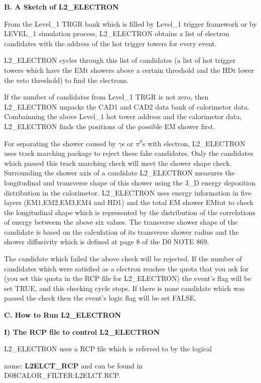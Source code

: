 \vskip 0.3in
\centerline{\bf B. A Sketch of L2\_ELECTRON}
\vskip 0.1in
From the Level\_1 TRGR bank which is filled by Level\_1 trigger 
framework
or by LEVEL\_1 simulation process, L2\_ELECTRON obtains a 
list of electron
candidates with the address of the hot trigger towers for every event.  

L2\_ELECTRON cycles through this list of candidates (a list
 of hot trigger
towers which have the EMt showers above a certain threshold
 and the HDt lower
the veto threshold) to find the electrons.

If the number of candidates from Level\_1 TRGR is not zero, then 
L2\_ELECTRON
unpacks the CAD1 and CAD2 data bank of calorimetor data.  Combainning 
the above 
Level\_1 hot tower address and the calorimetor data, L2\_ELECTRON 
finds the positions of the possible EM 
shower first.
 
For separating the shower caused by $\gamma$s or $\pi^0$s
with electron,
L2\_ELECTRON uses track marching package to reject these 
fake candidates. Only
the candidates which passed this track marching check will 
meet the shower shape
check. Surrounding the shower axis of a candidate 
L2\_ELECTRON measures the 
longitudinal and transverse shape of this shower 
using the 3\_D energy 
deposition distribution in the calorimetor. L2\_ELECTRON uses 
energy information
in five layers (EM1,EM2,EM3,EM4 and HD1) and the total EM shower 
EMtot to check
the longitudinal shape which is represented by the distribution of the 
correlations of energy betweem the above six values. The transverse 
shower 
shape of the candidate is based on the calculation of its transverse 
shower 
radius and the shower diffusivity which is defined at 
page 8 of the D0 NOTE 869. 

The candidate which failed the above check will be rejected. 
If the number
of candidates which were satisfied as a electron reaches the quota 
that you ask 
for (you set this quota in the RCP file for L2\_ELECTRON) the 
event's flag will
be set TRUE, and this checking cycle stops. If there is none 
candidate which
was passed 
the check then the event's logic flag will be set FALSE.

\vskip 0.2in
\centerline{\bf  C. How to Run L2\_ELECTRON}
\vskip 0.2in
\+\bf I)  The RCP file to control L2\_ELECTRON\cr

L2\_ELECTRON uses a RCP file which is referred to by the logical
\item{name:} 
{\bf L2ELCT\_RCP}
and can be found in D0\$CALOR\_FILTER:L2ELCT.RCP. 

